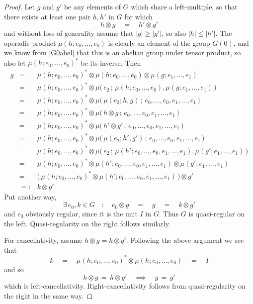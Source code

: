 \documentclass{amsbook} %
\numberwithin{section}{chapter}
\begin{document}
\begin{proof}
Let $g$ and $g'$ be any elements of $G$ which share a left-multiple, so that there exists at least one pair $h, h'$ in $G$ for which
\[ h \otimes g \quad = \quad h' \otimes g' \]
and without loss of generality assume that $|g| \ge |g'|$, so also $|h| \le |h'|$. The operadic product $\mu(h; e_0, ..., e_0)$ is clearly an element of the group $G(0)$, and we know from \cref{G0abel} that this is an abelian group under tensor product, so also let $\mu(h; e_0, ..., e_0)^*$ be its inverse. Then
\[ \begin{array}{rll}
			g & = & \mu(h; e_0, ..., e_0)^* \otimes \mu(h; e_0, ..., e_0) \otimes \mu(g; e_1, ..., e_1) \\
			& = & \mu(h; e_0, ..., e_0)^* \otimes \mu\big( \, e_2 \, ; \, \mu(h; e_0, ..., e_0), \mu(g; e_1, ..., e_1) \, \big) \\
			& = & \mu(h; e_0, ..., e_0)^* \otimes \mu\big( \, \mu(e_2; h, g) \, ; \, e_0, ..., e_0, e_1, ..., e_1 \, \big) \\
			& = & \mu(h; e_0, ..., e_0)^* \otimes \mu\big( \, h \otimes g \, ; \, e_0, ..., e_0, e_1, ..., e_1 \, \big) \\
			& = & \mu(h; e_0, ..., e_0)^* \otimes \mu\big( \, h' \otimes g' \, ; \, e_0, ..., e_0, e_1, ..., e_1 \, \big) \\
			& = & \mu(h; e_0, ..., e_0)^* \otimes \mu\big( \, \mu(e_2; h', g') \, ; \, e_0, ..., e_0, e_1, ..., e_1 \, \big) \\
			& = & \mu(h; e_0, ..., e_0)^* \otimes \mu\big( \, e_2 \, ; \, \mu(h'; e_0, ..., e_0, e_1, ..., e_1), \mu(g'; e_1, ..., e_1) \, \big) \\
			& = & \mu(h; e_0, ..., e_0)^* \otimes \mu(h'; e_0, ..., e_0, e_1, ..., e_1) \otimes \mu(g'; e_1, ..., e_1) \\
			& = & \big( \, \mu(h; e_0, ..., e_0)^* \otimes \mu(h'; e_0, ..., e_0, e_1, ..., e_1) \, \big) \otimes g' \\
			& =: & k \otimes g'
		\end{array}
\]
Put another way,
\[ \exists \, e_0, k \in G \quad : \quad e_0 \otimes g \quad = \quad g \quad = \quad k \otimes g' \]
and $e_0$ obviously regular, since it is the unit $I$ in $G$. Thus $G$ is quasi-regular on the left.  Quasi-regularity on the right follows similarly.

For cancellativity, assume $h \otimes g = h \otimes g'$. Following the above argument we see that
\[ k \quad = \quad \mu(h; e_0, ..., e_0)^* \otimes \mu(h; e_0, ..., e_0) \quad = \quad I \]
and so
\[ h \otimes g \, = \, h \otimes g' \quad \implies \quad g \, = \, g'  \]
which is left-cancellativity. Right-cancellativity follows from quasi-regularity on the right in the same way.
\end{proof}
\end{document}
